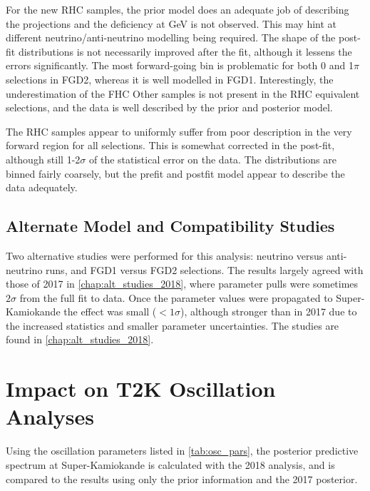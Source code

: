 For the new RHC samples, the prior model does an adequate job of describing the projections and the deficiency at  GeV is not observed. This may hint at different neutrino/anti-neutrino modelling being required. The shape of the post-fit distributions is not necessarily improved after the fit, although it lessens the errors significantly. The most forward-going bin is problematic for both 0 and 1$\pi$ selections in FGD2, whereas it is well modelled in FGD1. Interestingly, the underestimation of the FHC Other samples is not present in the RHC equivalent selections, and the data is well described by the prior and posterior model.

The \numu RHC samples appear to uniformly suffer from poor description in the very forward region for all selections. This is somewhat corrected in the post-fit, although still 1-2$\sigma$ of the statistical error on the data. The \pmu distributions are binned fairly coarsely, but the prefit and postfit model appear to describe the data adequately.

\subsection{Alternate Model and Compatibility Studies}
Two alternative studies were performed for this analysis: neutrino versus anti-neutrino runs, and FGD1 versus FGD2 selections. The results largely agreed with those of 2017 in \autoref{chap:alt_studies_2018}, where parameter pulls were sometimes $2\sigma$ from the full fit to data. Once the parameter values were propagated to Super-Kamiokande the effect was small ($<1\sigma$), although stronger than in 2017 due to the increased statistics and smaller parameter uncertainties. The studies are found in \autoref{chap:alt_studies_2018}.

\section{Impact on T2K Oscillation Analyses}
Using the oscillation parameters listed in \autoref{tab:osc_pars}, the posterior predictive spectrum at Super-Kamiokande is calculated with the 2018 analysis, and is compared to the results using only the prior information and the 2017 posterior.

